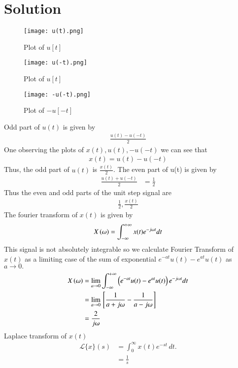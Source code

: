 \documentclass[journal,12pt,twocolumn]{IEEEtran}
\begin{document}
\section{Solution}
\begin{figure}[!ht]
         \centering
         \texttt{[image: u(t).png]}
         \caption{Plot of $u[t]$}
         \label{plot}
\end{figure}
\begin{figure}[!ht]
         \centering
         \texttt{[image: u(-t).png]}
         \caption{Plot of $u[t]$}
         \label{plot}
\end{figure}
\begin{figure}[!ht]
         \centering
         \texttt{[image: -u(-t).png]}
         \caption{Plot of $-u[-t]$}
         \label{plot}
\end{figure}
Odd part of $u(t)$ is given by
\begin{align}
    \frac{u(t)-u(-t)}{2}
\end{align}
One observing the plots of $x(t),u(t),-u(-t)$ we can see that
\begin{align}
    x(t)=u(t)-u(-t)
\end{align}
Thus, the odd part of $u(t)$ is $\frac{x(t)}{2}$.
The even part of u(t) is given by
\begin{align}
 \frac{u(t)+u(-t)}{2} &=\frac{1}{2}  
\end{align}
Thus the even and odd parts of the unit step signal are
\begin{align}
   \frac{1}{2} , \frac{x(t)}{2}
\end{align}
The fourier transform of $x(t)$ is given by
\begin{align}
    X\left(\omega\right) = \int_{ - \infty }^{ + \infty } x(t){e^{ - j\omega t}}dt
\end{align}
This signal is not absolutely integrable so we calculate Fourier Transform of $x(t)$ as a limiting case of the sum of exponential $e^{-at}u(t) - e^{at}u(t)$ as $a \to 0.$
\begin{align}
    X\left(\omega\right) &=\lim_{a \to 0} \int_{ - \infty }^{ + \infty } \left(e^{-at}u(t) - e^{at}u(t)\right){e^{ - j\omega t}}dt\\
    &=\lim_{a \to 0}{}\left[\frac{1}{a  +  j\omega}  -  \frac{1}{a  -  j\omega}\right]\\
    &=\frac{2}{j\omega}
\end{align}
Laplace transform of $x(t)$
\begin{align}
    \mathcal{L}\{x\}(s) &= \int_{0}^{\infty} x(t)e^{-st} \, dt.\\
    &=\frac{1}{s}
\end{align}
\end{document}
